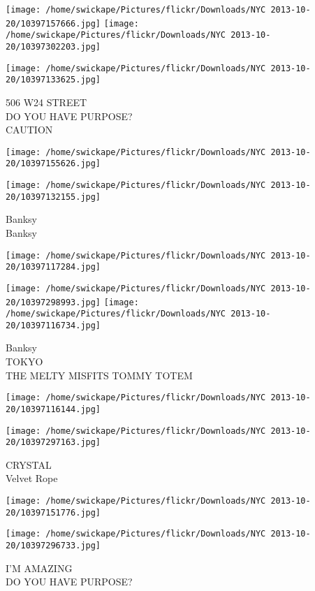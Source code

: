 \documentclass[10pt,letterpaper]{article}
\begin{document}
\texttt{[image: /home/swickape/Pictures/flickr/Downloads/NYC 2013-10-20/10397157666.jpg]}
\texttt{[image: /home/swickape/Pictures/flickr/Downloads/NYC 2013-10-20/10397302203.jpg]}

\texttt{[image: /home/swickape/Pictures/flickr/Downloads/NYC 2013-10-20/10397133625.jpg]}

506 W24 STREET\\
DO YOU HAVE PURPOSE?\\
CAUTION
\pagebreak

\texttt{[image: /home/swickape/Pictures/flickr/Downloads/NYC 2013-10-20/10397155626.jpg]}

\vspace{0.25in}
\texttt{[image: /home/swickape/Pictures/flickr/Downloads/NYC 2013-10-20/10397132155.jpg]}

Banksy\\
Banksy
\pagebreak

\texttt{[image: /home/swickape/Pictures/flickr/Downloads/NYC 2013-10-20/10397117284.jpg]}

\vspace{0.25in}
\texttt{[image: /home/swickape/Pictures/flickr/Downloads/NYC 2013-10-20/10397298993.jpg]}
\texttt{[image: /home/swickape/Pictures/flickr/Downloads/NYC 2013-10-20/10397116734.jpg]}

Banksy\\
TOKYO\\
THE MELTY MISFITS TOMMY TOTEM
\pagebreak

\texttt{[image: /home/swickape/Pictures/flickr/Downloads/NYC 2013-10-20/10397116144.jpg]}

\vspace{0.25in}
\texttt{[image: /home/swickape/Pictures/flickr/Downloads/NYC 2013-10-20/10397297163.jpg]}

CRYSTAL\\
Velvet Rope
\pagebreak

\texttt{[image: /home/swickape/Pictures/flickr/Downloads/NYC 2013-10-20/10397151776.jpg]}

\vspace{0.25in}
\texttt{[image: /home/swickape/Pictures/flickr/Downloads/NYC 2013-10-20/10397296733.jpg]}

I'M AMAZING\\
DO YOU HAVE PURPOSE?
\pagebreak
\end{document}
